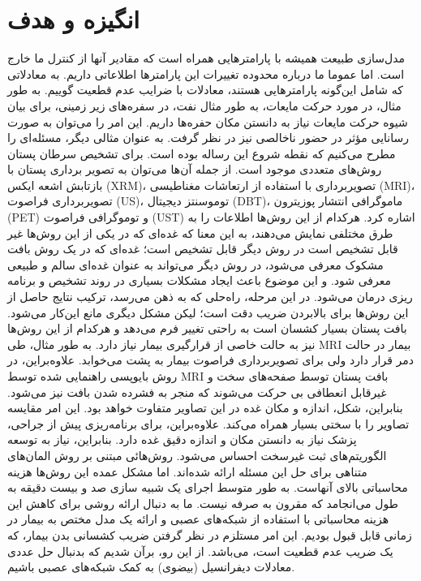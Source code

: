 \section*{انگیزه و هدف}
مدل‌سازی طبیعت همیشه با پارامترهایی همراه است که مقادیر آنها از کنترل ما خارج است. اما عموما ما درباره محدوده تغییرات این پارامترها اطلاعاتی داریم. به معادلاتی که شامل این‌گونه پارامترهایی هستند، معادلات با ضرایب عدم قطعیت گوییم. به طور مثال، در مورد حرکت مایعات، به طور مثال نفت، در سفره‌های زیر زمینی، برای بیان شیوه حرکت مایعات نیاز به دانستن مکان حفره‌ها داریم. این امر را می‌توان به صورت رسانایی مؤثر در حضور ناخالصی نیز در نظر گرفت. به عنوان مثالی دیگر، مسئله‌ای را مطرح می‌کنیم که نقطه شروع این رساله بوده است. 
برای تشخیص سرطان پستان روش‌های متعددی موجود است. از جمله آن‌ها می‌توان به تصویر برداری پستان با بازتابش اشعه ایکس (XRM)، تصویربرداری با استفاده از ارتعاشات مغناطیسی (MRI)، تصویربرداری فراصوت (US)، توموسنتز دیجیتال (DBT)، ماموگرافی انتشار پوزیترون (PET) و توموگرافی فراصوت (UST) اشاره کرد. هرکدام از این روش‌ها اطلاعات را به طرق مختلفی نمایش می‌دهند، به این معنا که غده‌ای که در یکی از این روش‌ها غیر قابل تشخیص است در روش دیگر قابل تشخیص است؛ غده‌ای که در یک روش بافت مشکوک معرفی می‌شود، در روش دیگر می‌تواند به عنوان غده‌ای سالم و طبیعی معرفی شود. و این موضوع باعث ایجاد مشکلات بسیاری در روند تشخیص و برنامه ریزی درمان می‌شود. در این مرحله، راه‌حلی که به ذهن می‌رسد، ترکیب نتایج حاصل از این روش‌ها برای بالابردن ضریب دقت است؛ لیکن مشکل دیگری مانع این‌کار می‌شود. بافت پستان بسیار کشسان است به راحتی تغییر فرم می‌دهد و هرکدام از این روش‌ها نیز به حالت خاصی از قرارگیری بیمار نیاز دارد. به طور مثال، طی MRI بیمار در حالت دمر قرار دارد ولی برای تصویربرداری فراصوت بیمار به پشت می‌خوابد. علاوه‌براین، در روش بایوپسی راهنمایی شده توسط MRI بافت پستان توسط صفحه‌های سخت و غیرقابل انعطافی بی حرکت می‌شوند که منجر به فشرده شدن بافت نیز می‌شود. بنابراین، شکل، اندازه و مکان غده در این تصاویر متفاوت خواهد بود. این امر مقایسه تصاویر را با سختی بسیار همراه می‌کند. علاوه‌براین، برای برنامه‌ریزی پیش از جراحی، پزشک نیاز به دانستن مکان و اندازه دقیق غده دارد. بنابراین، نیاز به توسعه الگوریتم‌های ثبت غیرسخت احساس می‌شود. 
روش‌هائی مبتنی بر روش المان‌های متناهی برای حل این مسئله ارائه شده‌اند. اما مشکل عمده این روش‌ها هزینه محاسباتی بالای آنهاست. به طور متوسط اجرای  یک شبیه سازی صد و بیست دقیقه به طول می‌انجامد که مقرون به صرفه نیست. ما به دنبال ارائه روشی برای کاهش این هزینه محاسباتی با استفاده از شبکه‌های عصبی و ارائه یک مدل مختص به بیمار در زمانی قابل قبول بودیم. این امر مستلزم در نظر گرفتن ضریب کشسانی بدن بیمار، که یک ضریب عدم قطعیت است، می‌باشد. از این رو، برآن شدیم که بدنبال حل عددی معادلات دیفرانسیل (بیضوی) به کمک شبکه‌های عصبی باشیم. 
